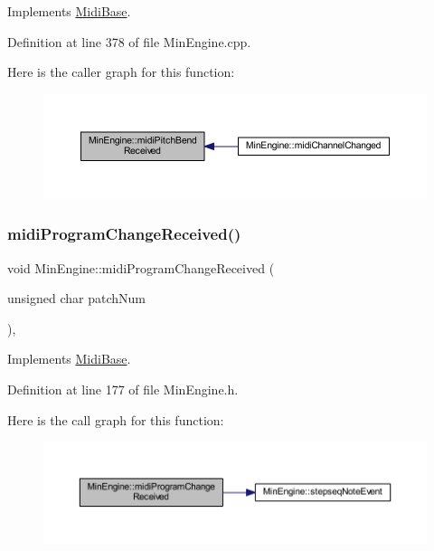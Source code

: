 Implements \hyperlink{class_midi_base_acfb1d2aef9901779bb53e0847121c13d}{Midi\+Base}.



Definition at line 378 of file Min\+Engine.\+cpp.

Here is the caller graph for this function\+:
\nopagebreak
\begin{figure}[H]
\begin{center}
\leavevmode
\includegraphics[width=350pt]{class_min_engine_a5b0f6a252cc4958e81d8989872105544_icgraph}
\end{center}
\end{figure}
\mbox{\label{class_min_engine_a0e772deba3710b21ef14f7a72994edb1}} 
\subsubsection{\texorpdfstring{midi\+Program\+Change\+Received()}{midiProgramChangeReceived()}}
{\footnotesize\ttfamily void Min\+Engine\+::midi\+Program\+Change\+Received (\begin{DoxyParamCaption}\item[{unsigned char}]{patch\+Num }\end{DoxyParamCaption})\hspace{0.3cm}{\ttfamily [inline]}, {\ttfamily [virtual]}}



Implements \hyperlink{class_midi_base_a968da0cf67e9a84757cbc2dbce90bc39}{Midi\+Base}.



Definition at line 177 of file Min\+Engine.\+h.

Here is the call graph for this function\+:
\nopagebreak
\begin{figure}[H]
\begin{center}
\leavevmode
\includegraphics[width=350pt]{class_min_engine_a0e772deba3710b21ef14f7a72994edb1_cgraph}
\end{center}
\end{figure}
\mbox{\label{class_min_engine_ac424a71b7b8e28ce4e6cd47bda488704}} 
